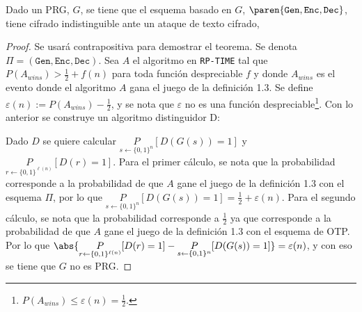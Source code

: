 \documentclass{ayudantia}
\begin{document}
\begin{thm}
    Dado un PRG, \(G\), se tiene que el esquema basado en \(G\), \(\paren{\texttt{Gen},\texttt{Enc},\texttt{Dec}}\), tiene cifrado indistinguible ante un ataque de texto cifrado,
\end{thm}
\begin{proof}
    Se usará contrapositiva para demostrar el teorema. Se denota \(\Pi=(\texttt{Gen},\texttt{Enc},\texttt{Dec})\). Sea \(A\) el algoritmo en \texttt{RP-TIME} tal que \(P(A_{wins})>\frac12+f(n)\) para toda función despreciable \(f\) y donde \(A_{wins}\) es el evento donde el algoritmo \(A\) gana el juego de la definición 1.3. Se define \(\varepsilon(n):=P(A_{wins})-\frac12\), y se nota que \(\varepsilon\) no es una función despreciable\footnote{\(P(A_{wins})\leq\varepsilon(n)=\frac12\).}. Con lo anterior se construye un algoritmo distinguidor D:
    \begin{center}
    \end{center}
    Dado \(D\) se quiere calcular \(\underset{s\leftarrow\{0,1\}^n}{P}[D(G(s))=1]\) y \(\underset{r\leftarrow\{0,1\}^{\ell(n)}}{P}[D(r)=1]\). Para el primer cálculo, se nota que la probabilidad corresponde a la probabilidad de que \(A\) gane el juego de la definición 1.3 con el esquema \(\Pi\), por lo que \(\underset{s\leftarrow\{0,1\}^n}{P}[D(G(s))=1]=\frac12+\varepsilon(n)\). Para el segundo cálculo, se nota que la probabilidad corresponde a \(\frac12\) ya que corresponde a la probabilidad de que \(A\) gane el juego de la definición 1.3 con el esquema de OTP. Por lo que \(\abs{\underset{r\leftarrow\{0,1\}^{\ell(n)}}{P}[D(r)=1]-\underset{s\leftarrow\{0,1\}^n}{P}[D(G(s))=1]}=\varepsilon(n)\), y con eso se tiene que \(G\) no es PRG.
\end{proof}
\end{document}
